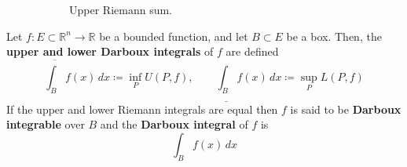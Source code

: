 \begin{definition}
\begin{figure}[H]
\begin{subfigure}[b]{0.48\textwidth}
        \caption{Upper Riemann sum.}
        \label{fig:upper_riemann_rum}
      \end{subfigure}
      \caption{}
    \end{figure}
  \end{definition}

  \begin{definition}
    \label{def:darboux-integral}
		Let $f: E \subset \mathbb{R}^n \to \mathbb{R}$ be a bounded function, and let $B \subset E$ be a box. Then, the \textbf{upper and lower Darboux integrals} of $f$ are defined 
    \begin{equation}
      \overline{\int_B} f(x) \,dx \coloneqq \inf_P U(P, f), \qquad \underline{\int_B} f(x) \,dx \coloneqq \sup_P L(P, f) 
    \end{equation}
    If the upper and lower Riemann integrals are equal then $f$ is said to be \textbf{Darboux integrable} over $B$ and the \textbf{Darboux integral} of $f$ is 
    \begin{equation}
      \int_B f(x) \,dx 
    \end{equation}
  \end{definition} 

